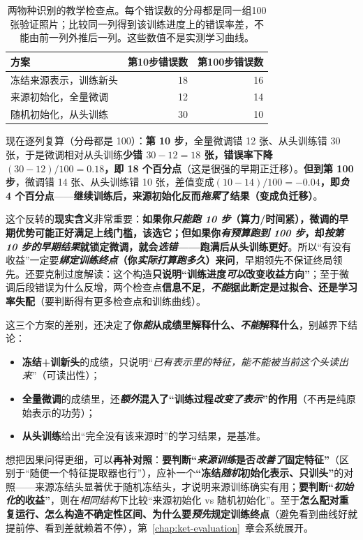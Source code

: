 \begin{table}[htbp]
  \centering
  \small
  \begin{tabularx}{\linewidth}{Xrr}
    \toprule
    方案 & 第10步错误数 & 第100步错误数 \\
    \midrule
    冻结来源表示，训练新头 & 18 & 16 \\
    来源初始化，全量微调 & 12 & 14 \\
    随机初始化，从头训练 & 30 & 10 \\
    \bottomrule
  \end{tabularx}
  \caption{两物种识别的教学检查点。每个错误数的分母都是同一组100张验证照片；比较同一列得到该训练进度上的错误率差，不能由前一列外推后一列。这些数值不是实测学习曲线。}
  \label{tab:ket-reuse-checkpoints}
\end{table}

现在逐列复算（分母都是 100）：\textbf{第 10 步}，全量微调错 12 张、从头训练错 30 张，于是微调相对从头训练\textbf{少错 $30-12=18$ 张，错误率下降 $(30-12)/100=0.18$，即 18 个百分点}（这是很强的早期正迁移）。\textbf{但到第 100 步}，微调错 14 张、从头训练错 10 张，差值变成\textbf{$(10-14)/100=-0.04$，即\emph{负} 4 个百分点}——\textbf{继续训练后，来源初始化反而\emph{拖累}了结果（变成负迁移）}。

这个反转的\textbf{现实含义}非常重要：\textbf{如果你\emph{只能跑 10 步}（算力/时间紧），微调的早期优势可能正好满足上线门槛，该选它；但如果你\emph{有预算跑到 100 步}，却\emph{按第 10 步的早期结果}就锁定微调，就会\emph{选错}——跑满后从头训练更好}。所以“有没有收益”一定要\textbf{\emph{绑定训练终点}（你\emph{实际打算跑多久}）来问}，早期领先不保证终局领先。还要克制过度解读：这个构造\textbf{只说明“训练进度\emph{可以}改变收益方向”}；至于微调后段错误为什么反增，两个检查点\textbf{信息不足}，\textbf{\emph{不能}据此断定是过拟合、还是学习率失配}（要判断得有更多检查点和训练曲线）。

这三个方案的差别，还决定了\textbf{你\emph{能}从成绩里解释什么、\emph{不能}解释什么}，别越界下结论：
\begin{itemize}\item \textbf{冻结+训新头}的成绩，只说明“\emph{已有表示里的特征，能不能被\emph{当前这个头}读出来}”（可读出性）；\item \textbf{全量微调}的成绩里，还\textbf{\emph{额外}混入了“训练过程\emph{改变了表示}”的作用}（不再是纯原始表示的功劳）；\item \textbf{从头训练}给出“完全没有该来源时”的学习结果，是基准。\end{itemize}
想把因果问得更细，可以\textbf{再补对照}：\textbf{要判断“\emph{来源训练}是否\emph{改善了}固定特征”}（区别于“随便一个特征提取器也行”），应补一个\textbf{“冻结\emph{随机}初始化表示、只训头”}的对照——来源冻结头显著优于随机冻结头，才说明来源训练确实有用；\textbf{要判断“\emph{初始化}的收益”}，则在\emph{相同结构}下比较“来源初始化 vs 随机初始化”。至于\textbf{怎么配对重复运行、怎么构造不确定性区间、为什么要\emph{预先}规定训练终点}（避免看到曲线好就提前停、看到差就赖着不停），第~\ref{chap:ket-evaluation}~章会系统展开。

